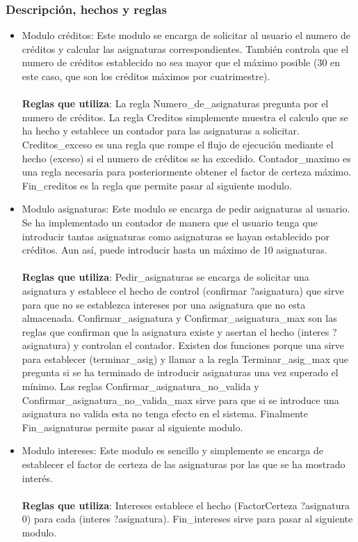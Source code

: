 \subsubsection{Descripción, hechos y reglas}
\begin{itemize}
   \item Modulo créditos: Este modulo se encarga de solicitar al usuario el numero de créditos y calcular las asignaturas correspondientes. También controla que el numero de créditos establecido no sea mayor que el máximo posible (30 en este caso, que son los créditos máximos por cuatrimestre).
   \\\\
   \textbf{Reglas que utiliza}: La regla Numero\_de\_asignaturas pregunta por el numero de créditos. La regla Creditos simplemente muestra el calculo que se ha hecho y establece un contador para las asignaturas a solicitar. Creditos\_exceso es una regla que rompe el flujo de ejecución mediante el hecho (exceso) si el numero de créditos se ha excedido. Contador\_maximo es una regla necesaria para posteriormente obtener el factor de certeza máximo. Fin\_creditos es la regla que permite pasar al siguiente modulo.

   \item Modulo asignaturas: Este modulo se encarga de pedir asignaturas al usuario. Se ha implementado un contador de manera que el usuario tenga que introducir tantas asignaturas como asignaturas se hayan establecido por créditos. Aun así, puede introducir hasta un máximo de 10 asignaturas.
   \\\\
   \textbf{Reglas que utiliza}: Pedir\_asignaturas se encarga de solicitar una asignatura y establece el hecho de control (confirmar ?asignatura) que sirve para que no se establezca intereses por una asignatura que no esta almacenada. Confirmar\_asignatura y Confirmar\_asignatura\_max son las reglas que confirman que la asignatura existe y asertan el hecho (interes ?asignatura) y controlan el contador. Existen dos funciones porque una sirve para establecer (terminar_asig) y llamar a la regla Terminar\_asig\_max que pregunta si se ha terminado de introducir asignaturas una vez superado el mínimo. Las reglas Confirmar\_asignatura\_no\_valida y Confirmar\_asignatura\_no\_valida\_max sirve  para que si se introduce una asignatura no valida esta no tenga efecto en el sistema. Finalmente Fin\_asignaturas permite pasar al siguiente modulo.

   \item Modulo intereses: Este modulo es sencillo y simplemente se encarga de establecer el factor de certeza de las asignaturas por las que se ha mostrado interés.
   \\\\
   \textbf{Reglas que utiliza}: Intereses establece el hecho (FactorCerteza ?asignatura 0) para cada (interes ?asignatura). Fin\_intereses sirve para pasar al siguiente modulo.


\end{itemize}
